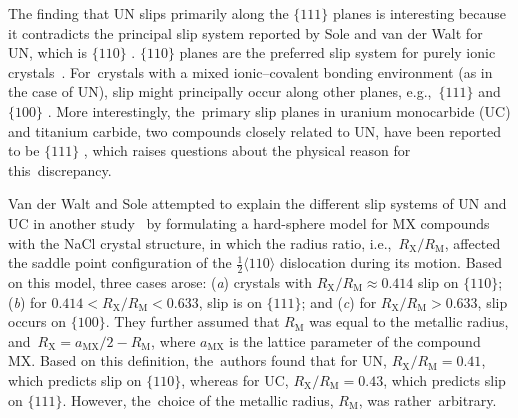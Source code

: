 \documentclass[applsci,article,accept,pdftex,moreauthors]{Definitions/mdpi}
\newcommand{\?}{\stackrel{?}{=}}
\begin{document}
The finding that UN slips primarily along the $\{111\}$ planes is interesting because it contradicts the principal slip system reported by Sole and van der Walt for UN, which is $\{110\}$ \cite{Sole1968}. $\{110\}$ planes are the preferred slip system for purely ionic \mbox{crystals~\cite{VanDerWalt1967, Hull2011}.} For~crystals with a mixed ionic--covalent bonding environment (as in the case of UN), slip might principally occur along other planes, e.g.,~$\{111\}$ and $\{100\}$ \cite{VanDerWalt1967, Yadav2014}. More interestingly, the~primary slip planes in uranium monocarbide (UC) and titanium carbide, two compounds closely related to UN, have been reported to be $\{111\}$ \cite{Sole1968, Vasudevamurthy2022}, which raises questions about the physical reason for this~discrepancy.

Van der Walt and Sole attempted to explain the different slip systems of UN and UC in another study~\cite{VanDerWalt1967} by formulating a hard-sphere model for MX compounds with the NaCl crystal structure, in which the radius ratio, i.e.,~$R_\text{X}/R_\text{M}$, affected the saddle point configuration of the $\frac{1}{2}\langle110\rangle$ dislocation during its motion. Based on this model, three cases arose: (\textit{a}) crystals with $R_\text{X}/R_\text{M} \approx 0.414$ slip on $\{110\}$; (\textit{b}) for $0.414 < R_\text{X}/R_\text{M} < 0.633$, slip is on $\{111\}$; and (\textit{c}) for $R_\text{X}/R_\text{M} > 0.633$, slip occurs on $\{100\}$. They further assumed that $R_\text{M}$ was equal to the metallic radius, and~$R_\text{X} = a_\text{MX}/2 - R_\text{M}$, where $a_\text{MX}$ is the lattice parameter of the compound MX. Based on this definition, the~authors found that for UN, $R_\text{X}/R_\text{M} = 0.41$, which predicts slip on $\{110\}$, whereas for UC, $R_\text{X}/R_\text{M} = 0.43$, which predicts slip on $\{111\}$. However, the~choice of the metallic radius, $R_\text{M}$, was rather~arbitrary.
\end{document}

